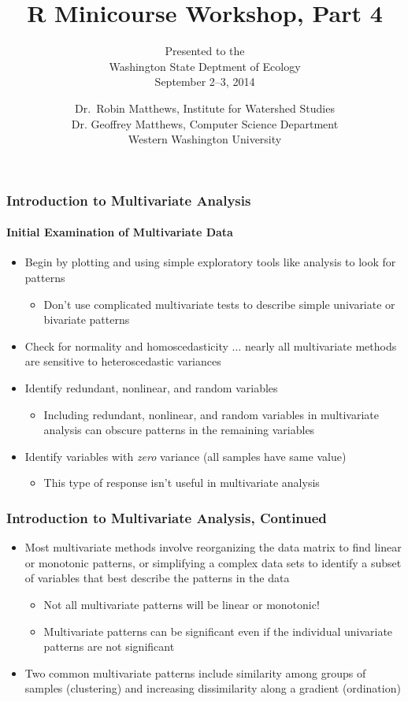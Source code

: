 \documentclass[10pt]{beamer}
\title{R Minicourse Workshop, Part 4}
\author{\small Presented to the\\
        Washington State Deptment of Ecology\\
       September 2--3, 2014}
\date{\scriptsize Dr.~Robin Matthews, Institute for Watershed Studies\\
   Dr. Geoffrey Matthews, Computer Science Department\\
   Western Washington University}
\begin{document}
\newcommand{\be}{\begin{enumerate}}
\newcommand{\ee}{\end{enumerate}}
\newcommand{\bi}{\begin{itemize}}
\newcommand{\ei}{\end{itemize}}
\newcommand{\bd}{\begin{description}}
\newcommand{\ed}{\end{description}}


\begin{frame}
\titlepage
\end{frame}

\begin{frame}
\frametitle{Introduction to Multivariate Analysis}
\framesubtitle{Initial Examination of Multivariate Data}

\bi
\item Begin by plotting and using simple exploratory tools like 
  analysis to look for patterns
\bi
\item Don't use complicated multivariate tests to describe
  simple univariate or bivariate patterns
\ei

\item Check for normality and homoscedasticity  $\ldots$ nearly all
  multivariate methods are sensitive to heteroscedastic variances

\item Identify redundant, nonlinear, and random variables
\bi
\item 
Including redundant, nonlinear, and random variables in
  multivariate analysis can obscure patterns in the remaining variables
\ei
\item Identify variables with {\em zero} variance (all samples have same value)
\bi
\item This type of response isn't useful in multivariate analysis
\ei
\ei
\end{frame}

\begin{frame}
\frametitle{Introduction to Multivariate Analysis, Continued}

\bi
\item Most multivariate methods involve reorganizing the data matrix
  to find linear or monotonic patterns, or simplifying a complex data
  sets to identify a subset of variables that best describe the
  patterns in the data

   \bi
   \item Not all multivariate patterns will be linear or monotonic!

    \item Multivariate patterns can be significant even if the individual
    univariate patterns are not significant
   \ei

\item 
Two common multivariate patterns include similarity among groups of
samples (clustering) and increasing dissimilarity along a gradient
(ordination)

\ei

\end{frame}
\end{document}
